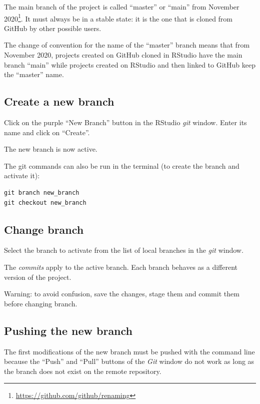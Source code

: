 \documentclass[
  12pt,
  american,
  a4paper,
  extrafontsizes,onecolumn,openright
  ]{memoir}
\begin{document}
The main branch of the project is called \enquote{master} or \enquote{main} from November 2020\footnote{\url{https://github.com/github/renaming}}.
It must always be in a stable state: it is the one that is cloned from GitHub by other possible users.

The change of convention for the name of the \enquote{master} branch means that from November 2020, projects created on GitHub cloned in RStudio have the main branch \enquote{main} while projects created on RStudio and then linked to GitHub keep the \enquote{master} name.

\hypertarget{create-a-new-branch}{%
\subsection{Create a new branch}\label{create-a-new-branch}}

Click on the purple \enquote{New Branch} button in the RStudio \emph{git} window.
Enter its name and click on \enquote{Create}.

The new branch is now active.

The git commands can also be run in the terminal (to create the branch and activate it):

\begin{verbatim}
git branch new_branch
git checkout new_branch
\end{verbatim}

\hypertarget{change-branch}{%
\subsection{Change branch}\label{change-branch}}

Select the branch to activate from the list of local branches in the \emph{git} window.

The \emph{commits} apply to the active branch.
Each branch behaves as a different version of the project.

Warning: to avoid confusion, save the changes, stage them and commit them before changing branch.

\hypertarget{pushing-the-new-branch}{%
\subsection{Pushing the new branch}\label{pushing-the-new-branch}}

The first modifications of the new branch must be pushed with the command line because the \enquote{Push} and \enquote{Pull} buttons of the \emph{Git} window do not work as long as the branch does not exist on the remote repository.
\end{document}
